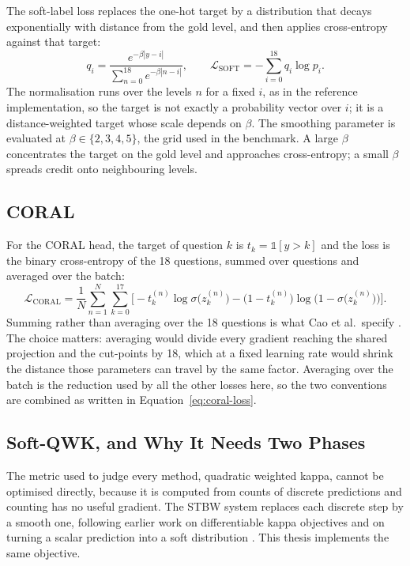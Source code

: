 The soft-label loss \cite{bertinetto2020soft} replaces the one-hot target by a distribution
that decays exponentially with distance from the gold level, and then applies cross-entropy
against that target:
\begin{equation}
q_i = \frac{e^{-\beta|y-i|}}{\sum_{n=0}^{18} e^{-\beta |n-i|}}, \qquad
\mathcal{L}_{\text{SOFT}} = -\sum_{i=0}^{18} q_i \log p_i .
\end{equation}
The normalisation runs over the levels $n$ for a fixed $i$, as in the reference
implementation, so the target is not exactly a probability vector over $i$; it is a
distance-weighted target whose scale depends on $\beta$. The smoothing parameter is evaluated
at $\beta \in \{2,3,4,5\}$, the grid used in the benchmark. A large $\beta$ concentrates the
target on the gold level and approaches cross-entropy; a small $\beta$ spreads credit onto
neighbouring levels.

\subsection{CORAL}

For the CORAL head, the target of question $k$ is $t_k = \mathbb{1}[y>k]$ and the loss is the
binary cross-entropy of the 18 questions, summed over questions and averaged over the batch:
\begin{equation}
\mathcal{L}_{\text{CORAL}} = \frac{1}{N}\sum_{n=1}^{N}\sum_{k=0}^{17}
\Big[-t_k^{(n)}\log\sigma\big(z_k^{(n)}\big)
-\big(1-t_k^{(n)}\big)\log\big(1-\sigma\big(z_k^{(n)}\big)\big)\Big].
\label{eq:coral-loss}
\end{equation}
Summing rather than averaging over the 18 questions is what Cao et al.\ specify
\cite{cao2020coral}. The choice matters: averaging would divide every gradient reaching the
shared projection and the cut-points by 18, which at a fixed learning rate would shrink the
distance those parameters can travel by the same factor. Averaging over the batch is the
reduction used by all the other losses here, so the two conventions are combined as written in
Equation~\ref{eq:coral-loss}.

\subsection{Soft-QWK, and Why It Needs Two Phases}

The metric used to judge every method, quadratic weighted kappa, cannot be optimised directly,
because it is computed from counts of discrete predictions and counting has no useful gradient.
The STBW system \cite{trigui2025stbw} replaces each discrete step by a smooth one, following
earlier work on differentiable kappa objectives \cite{delatorre2018wkl} and on turning a scalar
prediction into a soft distribution \cite{diaz2019softlabels}. This thesis implements the same
objective.

